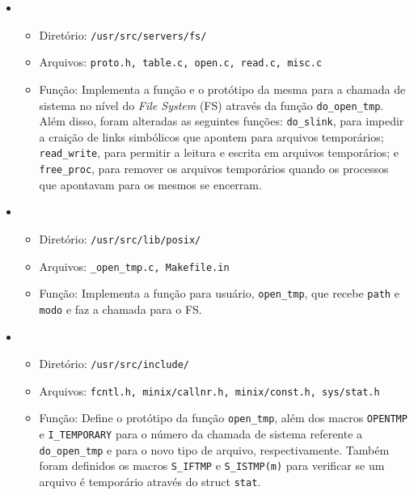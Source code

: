 \documentclass[12pt, a4paper]{article}
\begin{document}
\begin{itemize}

\item \begin{itemize}

\item Diretório: \texttt{/usr/src/servers/fs/}

\item Arquivos: \texttt{proto.h, table.c, open.c, read.c, misc.c}

\item Função: Implementa a função e o protótipo da mesma para a chamada de sistema no nível do \textit{File System} (FS) através da função \texttt{do{\_}open{\_}tmp}. Além disso, foram alteradas as seguintes funções: \texttt{do{\_}slink}, para impedir a craição de links simbólicos que apontem para arquivos temporários; \texttt{read{\_}write}, para permitir a leitura e escrita em arquivos temporários; e \texttt{free{\_}proc}, para remover os arquivos temporários quando os processos que apontavam para os mesmos se encerram.

\end{itemize}

\item \begin{itemize}

\item Diretório: \texttt{/usr/src/lib/posix/}

\item Arquivos: \texttt{{\_}open{\_}tmp.c, Makefile.in}

\item Função: Implementa a função para usuário, \texttt{open{\_}tmp}, que recebe \texttt{path} e \texttt{modo} e faz a chamada para o FS.

\end{itemize}

\item \begin{itemize}

\item Diretório: \texttt{/usr/src/include/}

\item Arquivos: \texttt{fcntl.h, minix/callnr.h, minix/const.h, sys/stat.h}

\item Função: Define o protótipo da função \texttt{open{\_}tmp}, além dos macros \texttt{OPENTMP} e \texttt{I{\_}TEMPORARY} para o número da chamada de sistema referente a \texttt{do{\_}open{\_}tmp} e para o novo tipo de arquivo, respectivamente. Também foram definidos os macros \texttt{S{\_}IFTMP} e \texttt{S{\_}ISTMP(m)} para verificar se um arquivo é temporário através do struct \texttt{stat}.

\end{itemize}

\end{itemize}
\end{document}
